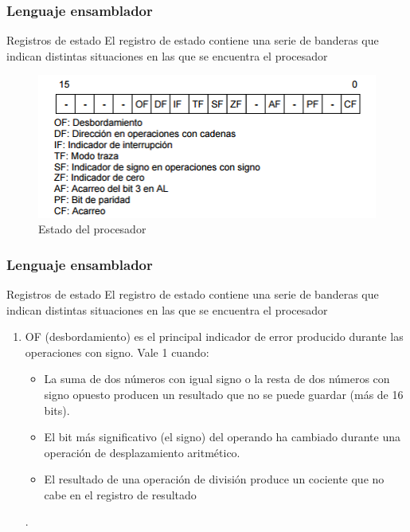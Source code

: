 \documentclass{beamer}
\begin{document}
\begin{frame}
	\frametitle{Lenguaje ensamblador}
	\begin{block}{Registros de estado} \justify
El registro de estado contiene una serie de banderas que indican distintas situaciones en las que
se encuentra el procesador 
		\begin{figure}[H]
		\centering
		\includegraphics[scale=0.4]{imagenes/banderas.png}
		\caption{Estado del procesador}
		\end{figure}			
	\end{block}		 		
\end{frame}


\begin{frame}
	\frametitle{Lenguaje ensamblador}
	\begin{block}{Registros de estado} \justify
El registro de estado contiene una serie de banderas que indican distintas situaciones en las que
se encuentra el procesador 
	\begin{enumerate}
		\item OF (desbordamiento) es el principal indicador de error producido durante las operaciones con
signo. Vale 1 cuando:	
			\begin{itemize}
				\item La suma de dos números con igual signo o la resta de dos números con signo opuesto
producen un resultado que no se puede guardar (más de 16 bits).
				\item El bit más significativo (el signo) del operando ha cambiado durante una operación de desplazamiento aritmético.
				\item El resultado de una operación de división produce un cociente que no cabe en el registro de resultado
			\end{itemize} .
	\end{enumerate}	
	\end{block}			 		
\end{frame}
\end{document}

